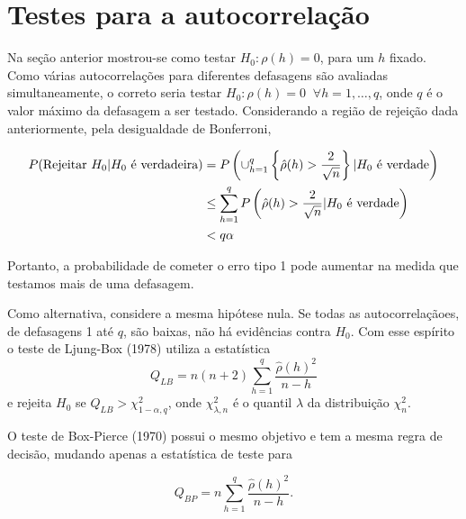 \documentclass[
  letterpaper,
  DIV=11,
  numbers=noendperiod]{scrartcl}
\theoremstyle{definition}
\theoremstyle{definition}
\theoremstyle{plain}
\theoremstyle{plain}
\theoremstyle{remark}
\begin{document}
\section{Testes para a
autocorrelação}\label{testes-para-a-autocorrelauxe7uxe3o}

Na seção anterior mostrou-se como testar \(H_0:\rho(h)=0\), para um
\(h\) fixado. Como várias autocorrelações para diferentes defasagens são
avaliadas simultaneamente, o correto seria testar
\(H_0: \rho(h)=0\;\;\forall h=1,\ldots,q\), onde \(q\) é o valor máximo
da defasagem a ser testado. Considerando a região de rejeição dada
anteriormente, pela desigualdade de Bonferroni,

\begin{align}P(\hbox{Rejeitar }H_0|H_0\hbox{ é verdadeira})&=P\left(\cup_{h=1}^q\left\{ \hat{\rho}(h)>\frac{2}{\sqrt{n}}\right\}| H_0\hbox{ é verdade}\right)\\
&\leq \sum_{h=1}^qP\left( \hat{\rho}(h)>\frac{2}{\sqrt{n}}| H_0\hbox{ é verdade}\right)\\ &<q\alpha\end{align}

Portanto, a probabilidade de cometer o erro tipo 1 pode aumentar na
medida que testamos mais de uma defasagem.

Como alternativa, considere a mesma hipótese nula. Se todas as
autocorrelaçãoes, de defasagens 1 até \(q\), são baixas, não há
evidências contra \(H_0\). Com esse espírito o teste de Ljung-Box (1978)
utiliza a estatística
\[Q_{LB}=n(n+2)\sum_{h=1}^q \frac{\hat{\rho}(h)^2}{n-h}\] e rejeita
\(H_0\) se \(Q_{LB}>\chi^2_{1-\alpha,q}\), onde \(\chi^2_{\lambda,n}\) é
o quantil \(\lambda\) da distribuição \(\chi^2_n\).

O teste de Box-Pierce (1970) possui o mesmo objetivo e tem a mesma regra
de decisão, mudando apenas a estatística de teste para

\[Q_{BP}=n\sum_{h=1}^q \frac{\hat{\rho}(h)^2}{n-h}.\]
\end{document}
